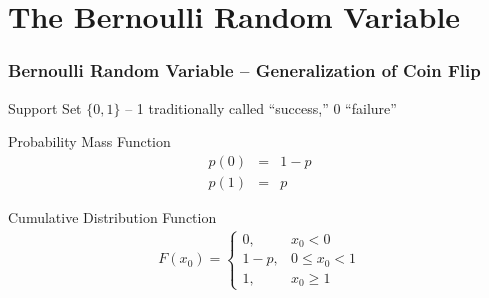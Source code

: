 \section{The Bernoulli Random Variable}
\begin{frame}
\frametitle{Bernoulli Random Variable -- Generalization of Coin Flip}
\small
\begin{block}{Support Set}
$\{0,1\}$ -- 1 traditionally called ``success,'' 0 ``failure''
\end{block}

\begin{block}{Probability Mass Function}
	\begin{eqnarray*}
		p(0) &=& 1-p\\
		p(1) &=& p
	\end{eqnarray*}

	\begin{block}{Cumulative Distribution Function}
\begin{eqnarray*}
	F(x_0) = \left\{\begin{array}{ll} 0,& x_0 < 0\\ 1-p, &0\leq x_0 < 1\\ 1,& x_0 \geq 1\end{array}\right.
\end{eqnarray*}
\end{block}
\end{block}

\end{frame}

